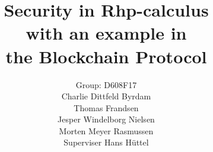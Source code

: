 \mainmatter  %

\title{Security in Rhp-calculus\\with an example in\\the Blockchain Protocol}




\author{Group: D608F17\\Charlie Dittfeld Byrdam\\Thomas Frandsen\\Jesper Windelborg Nielsen\\Morten Meyer Rasmussen\\Superviser Hans Hüttel}




\toctitle{}
\tocauthor{}
\maketitle

\begin{abstract}

\end{abstract}
